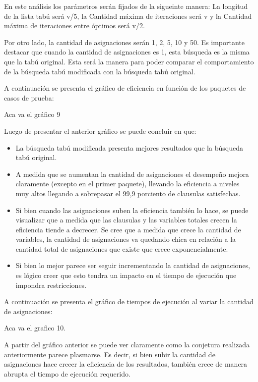 \documentclass[a4paper,10pt]{article}
\begin{document}
En este an\'alisis los par\'ametros ser\'an fijados de la sigueinte manera: La longitud de la lista tab\'u ser\'a v/5, la Cantidad m\'axima de iteraciones ser\'a v y la Cantidad m\'axima de iteraciones entre \'optimos ser\'a v/2.

Por otro lado, la cantidad de asignaciones ser\'an 1, 2, 5, 10 y 50. Es importante destacar que cuando la cantidad de asignaciones es 1, esta b\'usqueda es la misma que la tab\'u original. Esta ser\'a la manera para poder comparar el comportamiento de la b\'usqueda tab\'u modificada con la b\'usqueda tab\'u original.


A continuaci\'on se presenta el gr\'afico de eficiencia en funci\'on de los paquetes de casos de prueba:


Aca va el gr\'afico 9


Luego de presentar el anterior gr\'afico se puede concluir en que:

\begin{itemize}
\item La b\'usqueda tab\'u modificada presenta mejores resultados que la b\'usqueda tab\'u original.
\item A medida que se aumentan la cantidad de asignaciones el desempe\~{n}o mejora claramente (excepto en el primer paquete), llevando la eficiencia a niveles muy altos llegando a sobrepasar el 99,9 porciento de clausulas satisfechas.
\item Si bien cuando las asignaciones suben la eficiencia tambi\'en lo hace, se puede visualizar que a medida que las clausulas y las variables totales crecen la eficiencia tiende a decrecer. Se cree que a medida que crece la cantidad de variables, la cantidad de asignaciones va quedando chica en relaci\'on a la cantidad total de asignaciones que existe que crece exponencialmente.
\item Si bien lo mejor parece ser seguir incrementando la cantidad de asignaciones, es l\'ogico creer que esto tendra un impacto en el tiempo de ejecuci\'on que impondra restricciones.
\end{itemize}


A continuaci\'on se presenta el gr\'afico de tiempos de ejecuci\'on al variar la cantidad de asignaciones:

Aca va el grafico 10.


A partir del gr\'afico anterior se puede ver claramente como la conjetura realizada anteriormente parece plasmarse. Es decir, si bien subir la cantidad de asignaciones hace crecer la eficiencia de los resultados, tambi\'en crece de manera abrupta el tiempo de ejecuci\'on requerido. 
\end{document}
